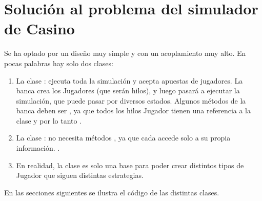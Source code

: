 \documentclass[letterpaper,10pt,spanish]{sphinxmanual}
\begin{document}
\section{Solución al problema del simulador de Casino}
\label{\detokenize{textos/anexos:solucion-al-problema-del-simulador-de-casino}}
Se ha optado por un diseño muy simple y con un acoplamiento muy alto. En pocas palabras hay solo dos clases:
\begin{enumerate}
\def\theenumi{\arabic{enumi}}
\def\labelenumi{\theenumi .}
\makeatletter\def\p@enumii{\p@enumi \theenumi .}\makeatother
\item {} 
La clase : ejecuta toda la simulación y acepta apuestas de jugadores. La banca crea los Jugadores (que serán hilos), y luego pasará a ejecutar la simulación, que puede pasar por diversos estados. Algunos métodos de la banca deben ser , ya que todos los hilos Jugador tienen una referencia a la clase  y por lo tanto .

\item {} 
La clase : no necesita métodos , ya que cada  accede solo a su propia información. .

\item {} 
En realidad, la clase  es solo una base para poder crear distintos tipos de Jugador que siguen distintas estrategias.

\end{enumerate}

En las secciones siguientes se ilustra el código de las distintas clases.
\end{document}
